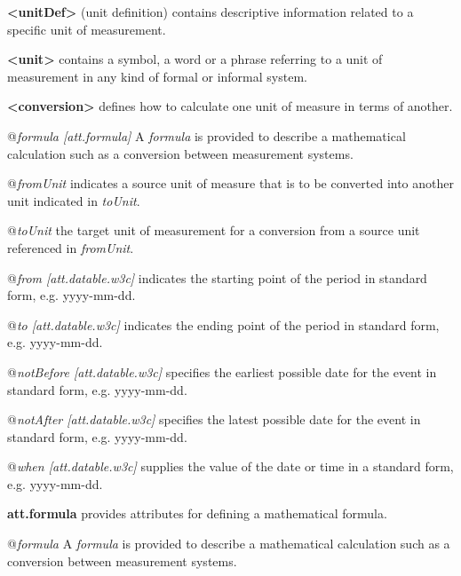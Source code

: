 \begin{sansreflist}
  
\item [\textbf{<unitDef>}] (unit definition) contains descriptive information related to a specific unit of measurement.
\item [\textbf{<unit>}] contains a symbol, a word or a phrase referring to a unit of measurement in any kind of formal or informal system.
\item [\textbf{<conversion>}] defines how to calculate one unit of measure in terms of another.\hfil\\[-10pt]\begin{sansreflist}
    \item[@{\itshape formula [att.formula]}]
  A {\itshape formula} is provided to describe a mathematical calculation such as a conversion between measurement systems.
    \item[@{\itshape fromUnit}]
  indicates a source unit of measure that is to be converted into another unit indicated in {\itshape toUnit}.
    \item[@{\itshape toUnit}]
  the target unit of measurement for a conversion from a source unit referenced in {\itshape fromUnit}.
    \item[@{\itshape from [att.datable.w3c]}]
  indicates the starting point of the period in standard form, e.g. yyyy-mm-dd.
    \item[@{\itshape to [att.datable.w3c]}]
  indicates the ending point of the period in standard form, e.g. yyyy-mm-dd.
    \item[@{\itshape notBefore [att.datable.w3c]}]
  specifies the earliest possible date for the event in standard form, e.g. yyyy-mm-dd.
    \item[@{\itshape notAfter [att.datable.w3c]}]
  specifies the latest possible date for the event in standard form, e.g. yyyy-mm-dd.
    \item[@{\itshape when [att.datable.w3c]}]
  supplies the value of the date or time in a standard form, e.g. yyyy-mm-dd.
\end{sansreflist}  
\item [\textbf{att.formula}] provides attributes for defining a mathematical formula.\hfil\\[-10pt]\begin{sansreflist}
    \item[@{\itshape formula}]
  A {\itshape formula} is provided to describe a mathematical calculation such as a conversion between measurement systems.
\end{sansreflist}  
\end{sansreflist}

